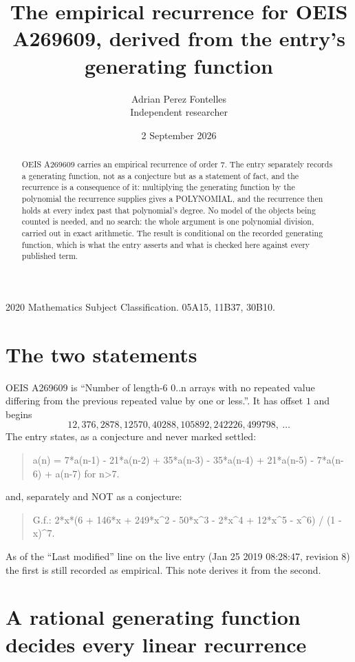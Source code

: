 \documentclass[11pt,a4paper]{article}
\title{The empirical recurrence for OEIS A269609, derived from the entry's generating function}
\author{Adrian Perez Fontelles\\ \small Independent researcher}
\date{2 September 2026}
\theoremstyle{plain}
\theoremstyle{definition}
\begin{document}
\maketitle

\begin{abstract}
OEIS A269609 carries an empirical recurrence of order $7$. The entry separately records a
generating function, not as a conjecture but as a statement of fact, and the recurrence is a
consequence of it: multiplying the generating function by the polynomial the recurrence
supplies gives a POLYNOMIAL, and the recurrence then holds at every index past that
polynomial's degree. No model of the objects being counted is needed, and no search: the
whole argument is one polynomial division, carried out in exact arithmetic. The result is
conditional on the recorded generating function, which is what the entry asserts and what is
checked here against every published term.
\end{abstract}

\noindent\small 2020 Mathematics Subject Classification. 05A15, 11B37, 30B10.\normalsize

\section{The two statements}

OEIS A269609 is ``Number of length-6 0..n arrays with no repeated value differing from the previous repeated value by one or less.''. It has offset $1$ and begins
\[
12, 376, 2878, 12570, 40288, 105892, 242226, 499798,\ \dots
\]
The entry states, as a conjecture and never marked settled:
\begin{quote}
a(n) = 7*a(n-1) - 21*a(n-2) + 35*a(n-3) - 35*a(n-4) + 21*a(n-5) - 7*a(n-6) + a(n-7) for n>7.
\end{quote}
and, separately and NOT as a conjecture:
\begin{quote}
G.f.: 2*x*(6 + 146*x + 249*x\^{}2 - 50*x\^{}3 - 2*x\^{}4 + 12*x\^{}5 - x\^{}6) / (1 - x)\^{}7.
\end{quote}
As of the ``Last modified'' line on the live entry (Jan 25 2019 08:28:47, revision 8) the first is still
recorded as empirical. This note derives it from the second.

\section{A rational generating function decides every linear recurrence}
\end{document}
